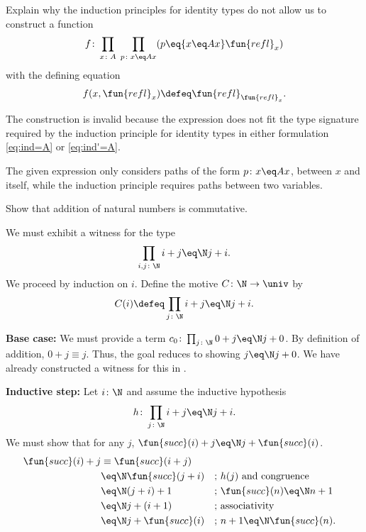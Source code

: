 \begin{exr}
    Explain why the induction principles for identity types do not allow us to construct a function
    \[
        f\colon\prod_{x\colon A}\;\prod_{p\colon x\eq Ax} (p\eq{x\eq Ax}\fun{refl}_x)
    \]
    with the defining equation
    \[
        f(x,\fun{refl}_x)\defeq\fun{refl}_{\fun{refl}_x}.
    \]
\end{exr}

\begin{solution}
    The construction is invalid because the expression does not fit the type signature required by the induction principle for identity types in either formulation \eqref{eq:ind=A} or \eqref{eq:ind'=A}.

    The given expression only considers paths of the form $p\colon x\eq Ax$, between $x$ and itself, while the induction principle requires paths between two variables.
\end{solution}

\begin{exr}\label{exr:+comm}
    Show that addition of natural numbers is commutative.
\end{exr}

\begin{solution}
    We must exhibit a witness for the type
    \[
        \prod_{i,j\colon\N} i+j \eq\N j+i.
    \]
    We proceed by induction on $i$. Define the motive $C \colon \N \to \univ$ by
    \[
        C(i) \defeq \prod_{j\colon\N} i+j \eq\N j+i.
    \]
    
    \textbf{Base case:} We must provide a term $c_0 \colon \prod_{j\colon\N}0+j\eq\N j+0$.
    By definition of addition, $0+j \equiv j$. Thus, the goal reduces to showing $j \eq\N j+0$. We have already constructed a witness for this in .

    \textbf{Inductive step:} Let $i\colon\N$ and assume the inductive hypothesis
    \[
        h \colon \prod_{j\colon\N} i+j \eq\N j+i.
    \]
    We must show that for any $j$, $\fun{succ}(i)+j \eq\N j+\fun{succ}(i)$.
    \begin{align*}
        \fun{succ}(i)+j &\equiv \fun{succ}(i+j) \\
            &\eq\N \fun{succ}(j+i) 
                &&\text{; $h(j)$ and congruence}\\
            &\eq\N (j+i)+1 
                &&\text{; } \fun{succ}(n) \eq\N n+1\\
            &\eq\N j+(i+1) 
                &&\text{; associativity}\\
            &\eq\N j+\fun{succ}(i) 
                &&\text{; } n+1 \eq\N \fun{succ}(n).
    \end{align*}
\end{solution}


